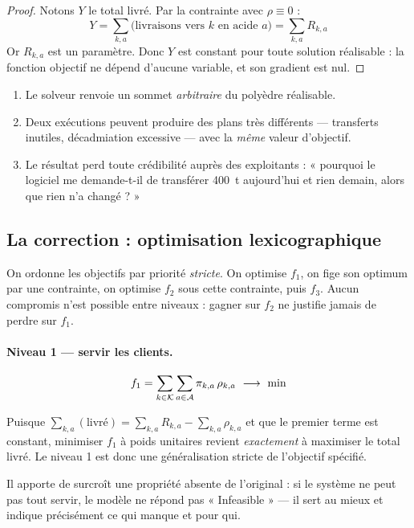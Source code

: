 \begin{proof}
Notons $Y$ le total livré. Par la contrainte  avec $\rho \equiv 0$ :
\[
Y = \sum_{k,a} \big(\text{livraisons vers } k \text{ en acide } a\big) = \sum_{k,a} R_{k,a}
\]
Or $R_{k,a}$ est un paramètre. Donc $Y$ est constant pour toute solution réalisable : la
fonction objectif ne dépend d'aucune variable, et son gradient est nul.
\end{proof}

\begin{alerte}[title={Conséquences pratiques}]
\begin{enumerate}
  \item Le solveur renvoie un sommet \emph{arbitraire} du polyèdre réalisable.
  \item Deux exécutions peuvent produire des plans très différents --- transferts inutiles,
        décadmiation excessive --- avec la \emph{même} valeur d'objectif.
  \item Le résultat perd toute crédibilité auprès des exploitants : « pourquoi le logiciel
        me demande-t-il de transférer \SI{400}{\tonne} aujourd'hui et rien demain, alors que
        rien n'a changé ? »
\end{enumerate}
\end{alerte}

\subsection{La correction : optimisation lexicographique}

On ordonne les objectifs par priorité \emph{stricte}. On optimise $f_1$, on fige son optimum
par une contrainte, on optimise $f_2$ sous cette contrainte, puis $f_3$. Aucun compromis
n'est possible entre niveaux : gagner sur $f_2$ ne justifie jamais de perdre sur $f_1$.

\paragraph{Niveau 1 --- servir les clients.}
\begin{equation}
f_1 = \sum_{k \in \mathcal{K}} \sum_{a \in \mathcal{A}} \pi_{k,a}\, \rho_{k,a} \ \longrightarrow\ \min
\end{equation}

\begin{encadre}[title={Équivalence avec l'objectif demandé}]
Puisque $\sum_{k,a}(\text{livré}) = \sum_{k,a} R_{k,a} - \sum_{k,a}\rho_{k,a}$ et que le
premier terme est constant, minimiser $f_1$ à poids unitaires revient \emph{exactement} à
maximiser le total livré. Le niveau 1 est donc une généralisation stricte de l'objectif
spécifié.

Il apporte de surcroît une propriété absente de l'original : si le système ne peut pas tout
servir, le modèle ne répond pas « Infeasible » --- il sert au mieux et indique précisément
ce qui manque et pour qui.
\end{encadre}

